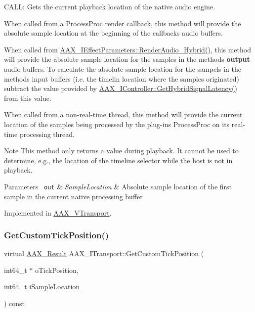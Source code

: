 C\+A\+LL\+: Gets the current playback location of the native audio engine. 

When called from a Process\+Proc render callback, this method will provide the absolute sample location at the beginning of the callback\textquotesingle{}s audio buffers.

When called from \mbox{\hyperlink{a00805_gae6139041de22f51f3146d26a01c54c1b}{A\+A\+X\+\_\+\+I\+Effect\+Parameters\+::\+Render\+Audio\+\_\+\+Hybrid()}}, this method will provide the absolute sample location for the samples in the method\textquotesingle{}s {\bfseries{output}} audio buffers. To calculate the absolute sample location for the sampels in the method\textquotesingle{}s input buffers (i.\+e. the timelin location where the samples originated) subtract the value provided by \mbox{\hyperlink{a00805_ga47b471c438fcad0798964b860d74609e}{A\+A\+X\+\_\+\+I\+Controller\+::\+Get\+Hybrid\+Signal\+Latency()}} from this value.

When called from a non-\/real-\/time thread, this method will provide the current location of the samples being processed by the plug-\/in\textquotesingle{}s Process\+Proc on its real-\/time processing thread.

\begin{DoxyNote}{Note}
This method only returns a value during playback. It cannot be used to determine, e.\+g., the location of the timeline selector while the host is not in playback.
\end{DoxyNote}

\begin{DoxyParams}[1]{Parameters}
\mbox{\texttt{ out}}  & {\em Sample\+Location} & Absolute sample location of the first sample in the current native processing buffer \\
\hline
\end{DoxyParams}


Implemented in \mbox{\hyperlink{a01941_ac15e5401cc221dd76f5a1260b6014148}{A\+A\+X\+\_\+\+V\+Transport}}.

\mbox{\label{a01885_a85aae48051f8596e8145268ecf173dcb}} 
\subsubsection{\texorpdfstring{GetCustomTickPosition()}{GetCustomTickPosition()}}
{\footnotesize\ttfamily virtual \mbox{\hyperlink{a00392_a4d8f69a697df7f70c3a8e9b8ee130d2f}{A\+A\+X\+\_\+\+Result}} A\+A\+X\+\_\+\+I\+Transport\+::\+Get\+Custom\+Tick\+Position (\begin{DoxyParamCaption}\item[{int64\+\_\+t $\ast$}]{o\+Tick\+Position,  }\item[{int64\+\_\+t}]{i\+Sample\+Location }\end{DoxyParamCaption}) const\hspace{0.3cm}{\ttfamily [pure virtual]}}



